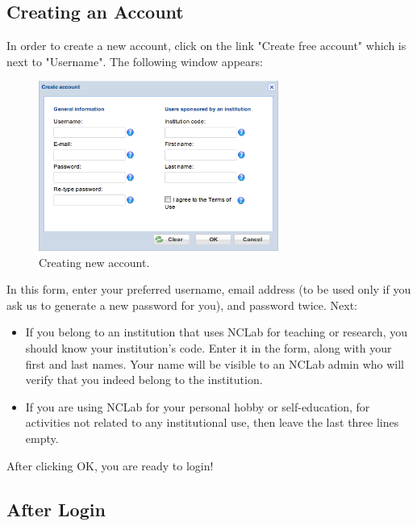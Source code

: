 \documentclass[article,A4,12pt]{llncs}
\begin{document}
\newpage

\subsection{Creating an Account}

In order to create a new account, click on the link "Create free account" which is next to
"Username". The following window appears:

\begin{figure}[!ht]
\begin{center}
\includegraphics[width=0.7\textwidth]{img/create-account.png}
\end{center}
\vspace{-4mm}
\caption{Creating new account.}
\label{fig:creacc}
\end{figure}

\noindent
In this form, enter your preferred username, email address (to be used only if you ask
us to generate a new password for you), and password twice. Next:

\begin{itemize}
\item If you belong to an institution 
      that uses NCLab for teaching or research, you should know your institution's code. Enter it in the form, 
      along with your first and last names. Your name will be visible to an NCLab admin
      who will verify that you indeed belong to the institution.
\item If you are using NCLab for your personal hobby or self-education, for activities not 
      related to any institutional use, then leave the last three lines empty. 
\end{itemize}
After clicking OK, you are ready to login!

\subsection{After Login}
\end{document}
